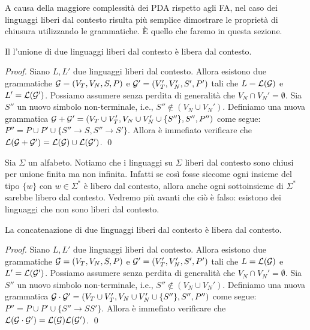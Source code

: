 \documentclass[runningheads,a4paper]{llncs}
\begin{document}
A causa della maggiore complessit\`{a} dei PDA rispetto agli FA, nel caso dei linguaggi liberi dal contesto risulta pi\`{u} semplice dimostrare le propriet\`{a} di chiusura utilizzando le grammatiche. \`{E} quello che faremo in questa sezione.

\begin{theorem}[Unione]\label{thm:unione-NPDA}
Il l'unione di due linguaggi liberi dal contesto \`{e} libera dal contesto.
\end{theorem}

\begin{proof}
Siano $L,L'$ due linguaggi liberi dal contesto. Allora esistono due grammatiche $\mathcal{G} = (V_T, V_N, S,P)$ e $\mathcal{G}' = (V_T', V_N', S',P')$ tali che $L = \mathcal{L}(\mathcal{G})$ e $L' = \mathcal{L}(\mathcal{G}')$. Possiamo assumere senza perdita di generalit\`{a} che $V_N \cap V_N' = \emptyset$. Sia $S''$ un nuovo simbolo non-terminale, i.e., $S'' \not\in (V_N \cup V_N')$. Definiamo una nuova grammatica $\mathcal{G} + \mathcal{G}' = (V_T\cup V_T',V_N\cup V_N'\cup\{S''\}, S'', P'')$ come segue: $P'' = P \cup P' \cup \{S'' \to S, S'' \to S'\}$. Allora \`{e} immefiato verificare che $\mathcal{L}(\mathcal{G} + \mathcal{G}') = \mathcal{L}(\mathcal{G}) \cup \mathcal{L}(\mathcal{G}')$.
\qed\end{proof}

\begin{remark}
Sia $\Sigma$ un alfabeto. Notiamo che i linguaggi su $\Sigma$ liberi dal contesto sono chiusi per unione finita ma non infinita. Infatti se cos\`{i} fosse siccome ogni insieme del tipo $\{w\}$ con $w \in \Sigma^*$ \`{e} libero dal contesto, allora anche ogni sottoinsieme di $\Sigma^*$ sarebbe libero dal contesto. Vedremo pi\`{u} avanti che ci\`{o} \`{e} falso: esistono dei linguaggi che non sono liberi dal contesto.
\end{remark}

\begin{theorem}[Concatenazione]\label{thm:conc-NPDA}
La concatenazione di due linguaggi liberi dal contesto \`{e} libera dal contesto.
\end{theorem}

\begin{proof}
Siano $L,L'$ due linguaggi liberi dal contesto. Allora esistono due grammatiche $\mathcal{G} = (V_T, V_N, S,P)$ e $\mathcal{G}' = (V_T', V_N', S',P')$ tali che $L = \mathcal{L}(\mathcal{G})$ e $L' = \mathcal{L}(\mathcal{G}')$. Possiamo assumere senza perdita di generalit\`{a} che $V_N \cap V_N' = \emptyset$. Sia $S''$ un nuovo simbolo non-terminale, i.e., $S'' \not\in (V_N \cup V_N')$. Definiamo una nuova grammatica $\mathcal{G} \cdot \mathcal{G}' = (V_T\cup V_T',V_N\cup V_N'\cup\{S''\}, S'', P'')$ come segue: $P'' = P \cup P' \cup \{S'' \to SS'\}$. Allora \`{e} immefiato verificare che $\mathcal{L}(\mathcal{G} \cdot \mathcal{G}') = \mathcal{L}(\mathcal{G})\mathcal{L}(\mathcal{G}')$.
\qed\end{proof}
\end{document}
